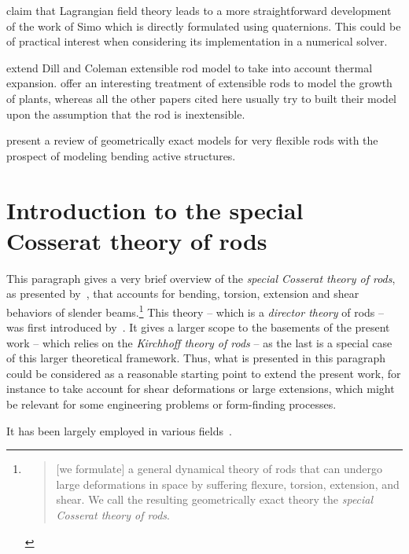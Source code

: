  claim that Lagrangian field theory leads to a more straightforward development of the work of Simo \cite{Simo1991} which is directly formulated using quaternions. This could be of practical interest when considering its implementation in a numerical solver.

 extend Dill and Coleman extensible rod model to take into account thermal expansion.  offer an interesting treatment of extensible rods to model the growth of plants, whereas all the other papers cited here usually try to built their model upon the assumption that the rod is inextensible.

 present a review of geometrically exact models for very flexible rods with the prospect of modeling bending active structures.


\section{Introduction to the special Cosserat theory of rods}\label{sec=cosserat_theory}

This paragraph gives a very brief overview of the \emph{special Cosserat theory of rods}, as presented by~, that accounts for bending, torsion, extension and shear  behaviors of slender beams.\footnote{\blockcquote[p.~270]{Antman2005}{[we formulate] a general dynamical theory of rods that can undergo large deformations in space by suffering flexure, torsion, extension, and shear. We call the resulting geometrically exact theory the \emph{special Cosserat theory of rods}.}} This theory -- which is a \emph{director theory} of rods -- was first introduced by~. It gives a larger scope to the basements of the present work -- which relies on the \emph{Kirchhoff theory of rods} -- as the last is a special case of this larger theoretical framework. Thus, what is presented in this paragraph could be considered as a reasonable starting point to extend the present work, for instance to take account for shear deformations or large extensions, which might be relevant for some engineering problems or form-finding processes.

It has been largely employed in various fields~\cite{Shi1995, Bergou2010}.

